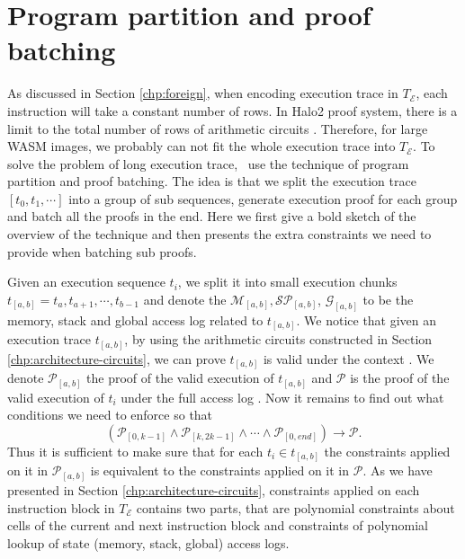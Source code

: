 \section{Program partition and proof batching}
\label{chp:sharding-batching}
As discussed in Section \ref{chp:foreign}, when encoding execution trace in $T_\mathcal{E}$, each instruction will take a constant number of rows. In Halo2 proof system, there is a limit to the total number of rows of arithmetic circuits \cite{halo2book}. Therefore, for large WASM images, we probably can not fit the whole execution trace into $T_\mathcal{E}$. To solve the problem of long execution trace,  \zkwasm\, use the technique of program partition and proof batching. The idea is that we split the execution trace $\left[t_0,t_1,\cdots\right]$ into a group of sub sequences, generate execution proof for each group and batch all the proofs in the end. Here we first give a bold sketch of the overview of the technique and then presents the extra constraints we need to provide when batching sub proofs.

\smallskip Given an execution sequence $t_i$, we split it into small execution chunks $t_{[a,b]} = {t_a, t_{a+1}, \cdots, t_{b-1}}$ and denote the $\mathcal{M}_{[a,b]}, \mathcal{SP}_{[a,b]}$, $\mathcal{G}_{[a,b]}$ to be the memory, stack and global access log related to $t_{[a,b]}$. We notice that given an execution trace $t_{[a,b]}$, by using the arithmetic circuits constructed in Section \ref{chp:architecture-circuits}, we can prove $t_{[a,b]}$ is valid under the context . We denote $\mathcal{P}_{[a,b]}$ the proof of the valid execution of $t_{[a,b]}$ and $\mathcal{P}$ is the proof of the valid execution of $t_i$ under the full access log \fullstate. Now it remains to find out what conditions we need to enforce so that
\[
   (\mathcal{P}_{[0,k-1]} \wedge   \mathcal{P}_{[k,2k-1]} \wedge \cdots \wedge   \mathcal{P}_{[0,end]}) \rightarrow
     \mathcal{P}.
\]
\noindent Thus it is sufficient to make sure that for each $t_i \in t_{[a,b]}$ the constraints applied on it in $\mathcal{P}_{[a,b]}$ is equivalent to the constraints applied on it in $\mathcal{P}$. As we have presented in Section \ref{chp:architecture-circuits}, constraints applied on each instruction block in $T_\mathcal{E}$ contains two parts, that are polynomial constraints about cells of the current and next instruction block and constraints of polynomial lookup of state (memory, stack, global) access logs.\\


